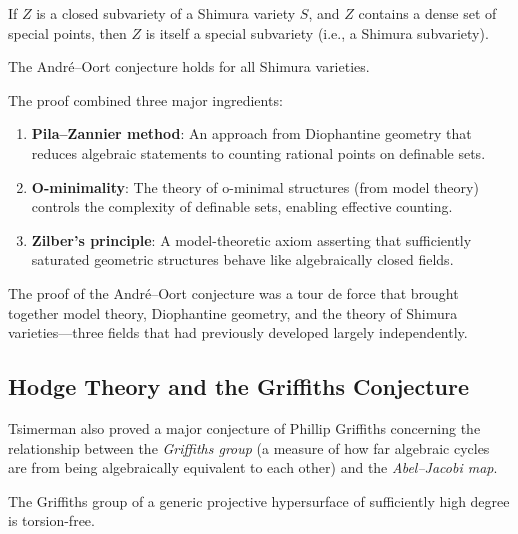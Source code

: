 \begin{conjecture}
If $Z$ is a closed subvariety of a Shimura variety $S$, and $Z$ contains a dense set of special points, then $Z$ is itself a special subvariety (i.e., a Shimura subvariety).
\end{conjecture}

\begin{theorem}
The Andr\'e--Oort conjecture holds for all Shimura varieties.
\end{theorem}

The proof combined three major ingredients:
\begin{enumerate}
\item \textbf{Pila--Zannier method}: An approach from Diophantine geometry that reduces algebraic statements to counting rational points on definable sets.
\item \textbf{O-minimality}: The theory of o-minimal structures (from model theory) controls the complexity of definable sets, enabling effective counting.
\item \textbf{Zilber's principle}: A model-theoretic axiom asserting that sufficiently saturated geometric structures behave like algebraically closed fields.
\end{enumerate}

\begin{highlightbox}
The proof of the Andr\'e--Oort conjecture was a tour de force that brought together model theory, Diophantine geometry, and the theory of Shimura varieties---three fields that had previously developed largely independently.
\end{highlightbox}

\subsection{Hodge Theory and the Griffiths Conjecture}
Tsimerman also proved a major conjecture of Phillip Griffiths concerning the relationship between the \emph{Griffiths group} (a measure of how far algebraic cycles are from being algebraically equivalent to each other) and the \emph{Abel--Jacobi map}.

\begin{theorem}
The Griffiths group of a generic projective hypersurface of sufficiently high degree is torsion-free.
\end{theorem}

